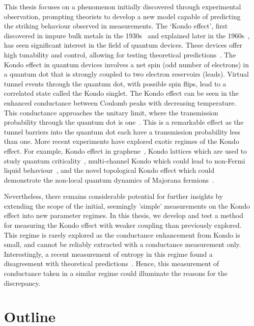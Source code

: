 This thesis focuses on a phenomenon initially discovered through experimental observation, prompting theorists to develop a new model capable of predicting the striking behaviour observed in measurements. The `Kondo effect', first discovered in impure bulk metals in the 1930s~\cite{de_haas} and explained later in the 1960s~\cite{jun_kondo}, has seen significant interest in the field of quantum devices. These devices offer high tunability and control, allowing for testing theoretical predictions~\cite{costi_kondo_mv_eo_regime}. 
The Kondo effect in quantum devices involves a net spin (odd number of electrons) in a quantum dot that is strongly coupled to two electron reservoirs (leads). Virtual tunnel events through the quantum dot, with possible spin flips, lead to a correlated state called the Kondo singlet. The Kondo effect can be seen in the enhanced conductance between Coulomb peaks with decreasing temperature. This conductance approaches the unitary limit, where the transmission probability through the quantum dot is one~\cite{kondo_unitary, kondo_unitary_theory, yigal_kondo}. This is a remarkable effect as the tunnel barriers into the quantum dot each have a transmission probability less than one. More recent experiments have explored exotic regimes of the Kondo effect. For example, Kondo effect in graphene~\cite{kondo_graphene}, Kondo lattices which are used to study quantum criticality~\cite{kondolattice}, multi-channel Kondo which could lead to non-Fermi liquid
behaviour~\cite{potok_2ck, iftikhar_2ck, kirchner_2ck}, and the novel topological Kondo effect which could demonstrate the non-local quantum dynamics of Majorana fermions~\cite{topological_kondo_majorana, topological_kondo, kondo_topological}.

Nevertheless, there remains considerable potential for further insights by extending the scope of the initial, seemingly 'simple' measurements on the Kondo effect into new parameter regimes. In this thesis, we develop and test a method for measuring the Kondo effect with weaker coupling than previously explored. This regime is rarely explored as the conductance enhancement from Kondo is small, and cannot be reliably extracted with a conductance measurement only. Interestingly, a recent measurement of entropy in this regime found a disagreement with theoretical predictions~\cite{child_strong}. Hence, this measurement of conductance taken in a similar regime could illuminate the reasons for the discrepancy.




\section{Outline}



